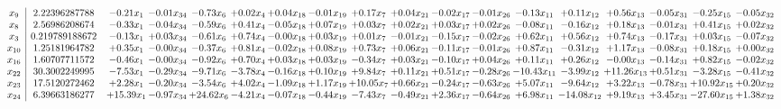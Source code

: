 \documentclass[9pt]{article}
\begin{document}
 \[\begin{array}{c| c c@{\hskip 2pt} c@{\hskip 2pt} c@{\hskip 2pt} c@{\hskip 2pt} c@{\hskip 2pt} c@{\hskip 2pt} c@{\hskip 2pt} c@{\hskip 2pt} c@{\hskip 2pt} c@{\hskip 2pt} c@{\hskip 2pt} c@{\hskip 2pt} c@{\hskip 2pt} c@{\hskip 2pt} c@{\hskip 2pt} c@{\hskip 2pt} }
 x_{9}   &  2.22396287788 & -0.21 x_{1} & -0.01 x_{34} & -0.73 x_{6} & +  0.02 x_{4} & +  0.04 x_{18} & -0.01 x_{19} & +  0.17 x_{7} & +  0.04 x_{21} & -0.02 x_{17} & -0.01 x_{26} & -0.13 x_{11} & +  0.11 x_{12} & +  0.56 x_{13} & -0.05 x_{31} & -0.25 x_{15} & -0.05 x_{32}\\
 x_{8}   &  2.56986208674 & -0.33 x_{1} & -0.04 x_{34} & -0.59 x_{6} & +  0.41 x_{4} & -0.05 x_{18} & +  0.07 x_{19} & +  0.03 x_{7} & +  0.02 x_{21} & +  0.03 x_{17} & +  0.02 x_{26} & -0.08 x_{11} & -0.16 x_{12} & +  0.18 x_{13} & -0.01 x_{31} & +  0.41 x_{15} & +  0.02 x_{32}\\
 x_{3}   &  0.219789188672 & -0.13 x_{1} & +  0.03 x_{34} & -0.61 x_{6} & +  0.74 x_{4} & -0.00 x_{18} & +  0.03 x_{19} & +  0.01 x_{7} & -0.01 x_{21} & -0.15 x_{17} & -0.02 x_{26} & +  0.62 x_{11} & +  0.56 x_{12} & +  0.74 x_{13} & -0.17 x_{31} & +  0.03 x_{15} & -0.07 x_{32}\\
 x_{10}   &  1.25181964782 & +  0.35 x_{1} & -0.00 x_{34} & -0.37 x_{6} & +  0.81 x_{4} & -0.02 x_{18} & +  0.08 x_{19} & +  0.73 x_{7} & +  0.06 x_{21} & -0.11 x_{17} & -0.01 x_{26} & +  0.87 x_{11} & -0.31 x_{12} & +  1.17 x_{13} & -0.08 x_{31} & +  0.18 x_{15} & +  0.00 x_{32}\\
 x_{16}   &  1.60707711572 & -0.46 x_{1} & -0.00 x_{34} & -0.92 x_{6} & +  0.70 x_{4} & +  0.03 x_{18} & +  0.03 x_{19} & -0.34 x_{7} & +  0.03 x_{21} & -0.10 x_{17} & +  0.04 x_{26} & +  0.11 x_{11} & +  0.26 x_{12} & -0.00 x_{13} & -0.14 x_{31} & +  0.82 x_{15} & -0.02 x_{32}\\
 x_{22}   &  30.3002249995 & -7.53 x_{1} & -0.29 x_{34} & -9.71 x_{6} & -3.78 x_{4} & -0.16 x_{18} & +  0.10 x_{19} & +  9.84 x_{7} & +  0.11 x_{21} & +  0.51 x_{17} & -0.28 x_{26} & -10.43 x_{11} & -3.99 x_{12} & + 11.26 x_{13} & +  0.51 x_{31} & -3.28 x_{15} & -0.41 x_{32}\\
 x_{23}   &  17.5120272462 & +  2.28 x_{1} & -0.20 x_{34} & -3.54 x_{6} & +  4.02 x_{4} & -1.09 x_{18} & +  1.17 x_{19} & + 10.05 x_{7} & +  0.66 x_{21} & -0.24 x_{17} & -0.63 x_{26} & +  5.07 x_{11} & -9.64 x_{12} & +  3.22 x_{13} & -0.78 x_{31} & + 10.92 x_{15} & +  0.20 x_{32}\\
 x_{24}   &  6.39663186277 & + 15.39 x_{1} & -0.97 x_{34} & + 24.62 x_{6} & -4.21 x_{4} & -0.07 x_{18} & -0.44 x_{19} & -7.43 x_{7} & -0.49 x_{21} & +  2.36 x_{17} & -0.64 x_{26} & +  6.98 x_{11} & -14.08 x_{12} & +  9.19 x_{13} & +  3.45 x_{31} & -27.60 x_{15} & +  1.38 x_{32}\\

\end{array}\]
\end{document}
